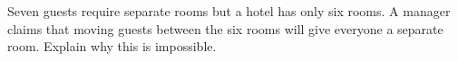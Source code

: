 Seven guests require separate rooms but a hotel has only six rooms. A manager claims that moving guests between the six rooms will give everyone a separate room. Explain why this is impossible.

